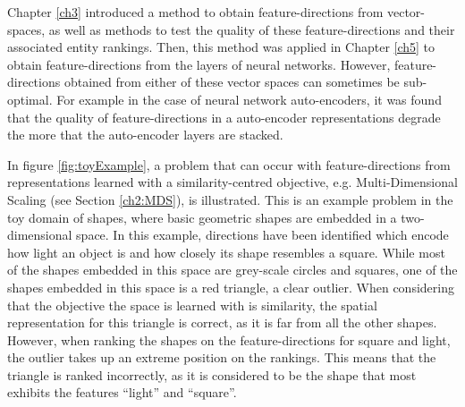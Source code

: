 
Chapter \ref{ch3} introduced a method to obtain  feature-directions from vector-spaces, as well as methods to test the quality of these feature-directions and their  associated entity rankings. Then, this method was applied in Chapter \ref{ch5} to obtain feature-directions from the layers of neural networks. However, feature-directions obtained from either of these vector spaces can sometimes be sub-optimal. For example in the case of neural network auto-encoders, it was found that the quality of feature-directions in a auto-encoder representations degrade the more that the auto-encoder layers are stacked.  






 In figure \ref{fig:toyExample}, a problem that can occur with feature-directions from representations learned with a similarity-centred objective, e.g. Multi-Dimensional Scaling (see Section \ref{ch2:MDS}), is illustrated. This is an example problem in the toy domain of shapes, where  basic geometric shapes are embedded in a two-dimensional space. In this example, directions have been identified which encode how light an object is and how closely its shape resembles a square. While most of the shapes embedded in this space are grey-scale circles and squares, one of the shapes embedded in this space is a red triangle, a clear outlier. When considering that the objective the space is learned with is similarity, the spatial representation for this triangle  is correct,  as it is far from all the other shapes. However, when ranking the shapes on the feature-directions for square and light, the  outlier  takes up an extreme position on the rankings. This means that the triangle is ranked incorrectly, as it is considered to be the shape that most exhibits the features ``light'' and ``square''.

